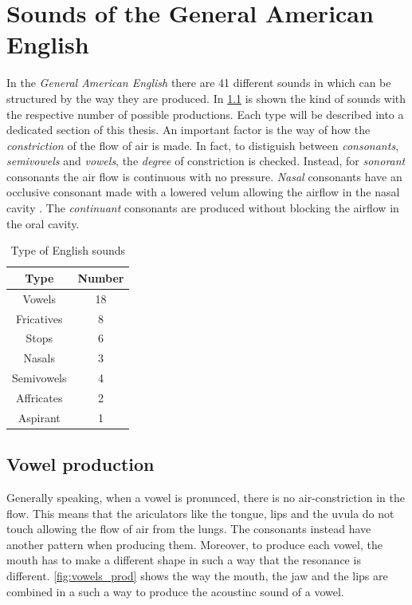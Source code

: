 \chapter{Sounds of the General American English}
\label{chap:english_language}
In the \textit{General American English} there are 41 different sounds in which can be structured by the way they are produced. In \ref{table:english_sounds} is shown the kind of sounds with the respective number of possible productions. Each type will be described into a dedicated section of this thesis. An important factor is the way of how the \textit{constriction} of the flow of air is made. In fact, to distiguish between \textit{consonants}, \textit{semivowels} and \textit{vowels}, the \textit{degree} of constriction is checked. Instead, for \textit{sonorant} consonants the air flow is continuous with no pressure. \textit{Nasal} consonants have an occlusive consonant made with a lowered velum allowing the airflow in the nasal cavity \cite{nasal_consonants_wiki}. The \textit{continuant} consonants are produced without blocking the airflow in the oral cavity.

\begin{table}[h]
    \centering
    \begin{tabular}{|c|c|}
        \hline
        \textbf{Type}& \textbf{Number} \\ \hline
        Vowels     & 18     \\ \hline
        Fricatives & 8      \\ \hline
        Stops      & 6      \\ \hline
        Nasals     & 3      \\ \hline
        Semivowels & 4      \\ \hline
        Affricates & 2      \\ \hline
        Aspirant   & 1      \\ \hline
    \end{tabular}
    \caption {Type of English sounds}
\label{table:english_sounds}
\end{table}


\section{Vowel production}
\label{sec:vowel_production}
Generally speaking, when a vowel is pronunced, there is no air-constriction in the flow. This means that the ariculators like the tongue, lips and the uvula do not touch allowing the flow of air from the lungs. The consonants instead have another pattern when producing them. Moreover, to produce each vowel, the mouth has to make a different shape in such a way that the resonance is different. \ref{fig:vowels_prod} shows the way the mouth, the jaw and the lips are combined in a such a way to produce the acoustinc sound of a vowel.

